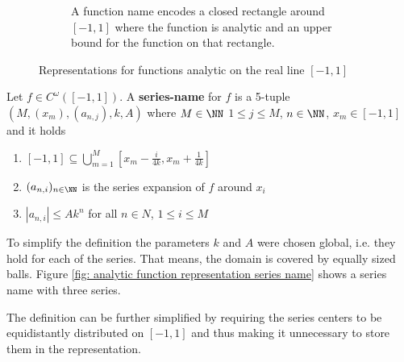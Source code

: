 \begin{figure}
\begin{subfigure}{.45\textwidth}
			\caption{A function name encodes a closed rectangle around $[-1,1]$ where the function is analytic and an upper bound for the function on that rectangle.}\label{fig: analytic function representation function name}
		\end{subfigure}
		\caption{Representations for functions analytic on the real line $[-1,1]$}\label{fig: analytic function representations}
	 \end{figure}
	\begin{definition}\label{def:series_name_rect}
		Let $f \in C^\omega([-1,1])$.
		A \textbf{series-name} for $f$ is a 5-tuple $(M, (x_m), (a_{n, j}), k, A)$ where $M \in \NN$
		$1 \leq j \leq M$, $n \in \NN$, $x_m \in [-1,1]$ and it holds
		\begin{enumerate}
			\item $[-1,1] \subseteq \bigcup_{m=1}^M [x_m - \frac{i}{4k}, x_m + \frac{1}{4k}]$
			\item $(a_{n,i})_{n \in \NN}$ is the series expansion of $f$ around $x_i$
			\item $|a_{n,i}| \leq Ak^n$ for all $n \in N$, $1 \leq i \leq M$
		\end{enumerate}
	\end{definition}
	To simplify the definition the parameters $k$ and $A$ were chosen global, i.e. they hold for each of the series.
	That means, the domain is covered by equally sized balls. 
	Figure \ref{fig: analytic function representation series name} shows a series name with three series.
	
	The definition can be further simplified by requiring the series centers to be equidistantly distributed on $[-1,1]$ and thus
	making it unnecessary to store them in the representation.

